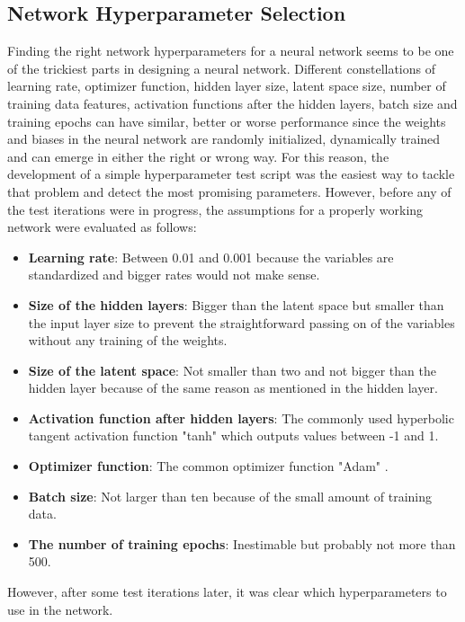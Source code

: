 \documentclass[MGS,Master,english]{twbook}%
\begin{document}
\subsection{Network Hyperparameter Selection} \label{chapter::vae::network}
Finding the right network hyperparameters for a neural network seems to be one of the trickiest parts in designing a neural network. Different constellations of learning rate, optimizer function, hidden layer size, latent space size, number of training data features, activation functions after the hidden layers, batch size and training epochs can have similar, better or worse performance since the weights and biases in the neural network are randomly initialized, dynamically trained and can emerge in either the right or wrong way. For this reason, the development of a simple hyperparameter test script was the easiest way to tackle that problem and detect the most promising parameters. However, before any of the test iterations were in progress, the assumptions for a properly working network were evaluated as follows:
\begin{itemize}
	\item \textbf{Learning rate}: Between 0.01 and 0.001 because the variables are standardized and bigger rates would not make sense.
	\item \textbf{Size of the hidden layers}: Bigger than the latent space but smaller than the input layer size to prevent the straightforward passing on of the variables without any training of the weights.
	\item \textbf{Size of the latent space}: Not smaller than two and not bigger than the hidden layer because of the same reason as mentioned in the hidden layer.
	\item \textbf{Activation function after hidden layers}: The commonly used hyperbolic tangent activation function  "tanh" which outputs values between -1 and 1. 
	\item \textbf{Optimizer function}: The common optimizer function "Adam" \cite{ml::optimizer::overview}.
	\item \textbf{Batch size}: Not larger than ten because of the small amount of training data.
	\item \textbf{The number of training epochs}: Inestimable but probably not more than 500.
\end{itemize}
However, after some test iterations later, it was clear which hyperparameters to use in the network.
\end{document}
